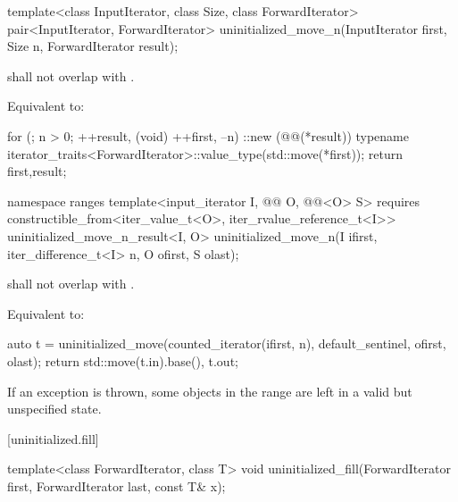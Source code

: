 %
\begin{itemdecl}
template<class InputIterator, class Size, class ForwardIterator>
  pair<InputIterator, ForwardIterator>
    uninitialized_move_n(InputIterator first, Size n, ForwardIterator result);
\end{itemdecl}

\begin{itemdescr}
\pnum
\expects
{} shall not overlap with .

\pnum
\effects
Equivalent to:
\begin{codeblock}
for (; n > 0; ++result, (void) ++first, --n)
  ::new (@@(*result))
    typename iterator_traits<ForwardIterator>::value_type(std::move(*first));
return {first,result};
\end{codeblock}
\end{itemdescr}

%
\begin{itemdecl}
namespace ranges {
  template<input_iterator I, @@ O, @@<O> S>
      requires constructible_from<iter_value_t<O>, iter_rvalue_reference_t<I>>
    uninitialized_move_n_result<I, O>
      uninitialized_move_n(I ifirst, iter_difference_t<I> n, O ofirst, S olast);
}
\end{itemdecl}

\begin{itemdescr}
\pnum
\expects
{} shall not overlap with
.

\pnum
\effects
Equivalent to:
\begin{codeblock}
auto t = uninitialized_move(counted_iterator(ifirst, n),
                            default_sentinel, ofirst, olast);
return {std::move(t.in).base(), t.out};
\end{codeblock}

\pnum
\begin{note}
If an exception is thrown, some objects in the range
are left in a valid but unspecified state.
\end{note}
\end{itemdescr}

[uninitialized.fill]{}

%
\begin{itemdecl}
template<class ForwardIterator, class T>
  void uninitialized_fill(ForwardIterator first, ForwardIterator last, const T& x);
\end{itemdecl}

